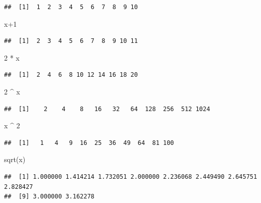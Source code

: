 \documentclass[
]{book}
\newenvironment{Shaded}{\begin{snugshade}}{\end{snugshade}}
\newcommand{\DecValTok}[1]{\textcolor[rgb]{0.00,0.00,0.81}{#1}}
\newcommand{\FunctionTok}[1]{\textcolor[rgb]{0.00,0.00,0.00}{#1}}
\newcommand{\NormalTok}[1]{#1}
\newcommand{\SpecialCharTok}[1]{\textcolor[rgb]{0.00,0.00,0.00}{#1}}
\theoremstyle{definition}
\theoremstyle{definition}
\theoremstyle{definition}
\theoremstyle{definition}
\theoremstyle{remark}
\begin{document}
\begin{verbatim}
##  [1]  1  2  3  4  5  6  7  8  9 10
\end{verbatim}

\begin{Shaded}
\begin{Highlighting}[]
\NormalTok{x}\SpecialCharTok{+}\DecValTok{1}
\end{Highlighting}
\end{Shaded}

\begin{verbatim}
##  [1]  2  3  4  5  6  7  8  9 10 11
\end{verbatim}

\begin{Shaded}
\begin{Highlighting}[]
\DecValTok{2} \SpecialCharTok{*}\NormalTok{ x}
\end{Highlighting}
\end{Shaded}

\begin{verbatim}
##  [1]  2  4  6  8 10 12 14 16 18 20
\end{verbatim}

\begin{Shaded}
\begin{Highlighting}[]
\DecValTok{2} \SpecialCharTok{\^{}}\NormalTok{ x}
\end{Highlighting}
\end{Shaded}

\begin{verbatim}
##  [1]    2    4    8   16   32   64  128  256  512 1024
\end{verbatim}

\begin{Shaded}
\begin{Highlighting}[]
\NormalTok{x }\SpecialCharTok{\^{}} \DecValTok{2}
\end{Highlighting}
\end{Shaded}

\begin{verbatim}
##  [1]   1   4   9  16  25  36  49  64  81 100
\end{verbatim}

\begin{Shaded}
\begin{Highlighting}[]
\FunctionTok{sqrt}\NormalTok{(x)}
\end{Highlighting}
\end{Shaded}

\begin{verbatim}
##  [1] 1.000000 1.414214 1.732051 2.000000 2.236068 2.449490 2.645751 2.828427
##  [9] 3.000000 3.162278
\end{verbatim}
\end{document}
